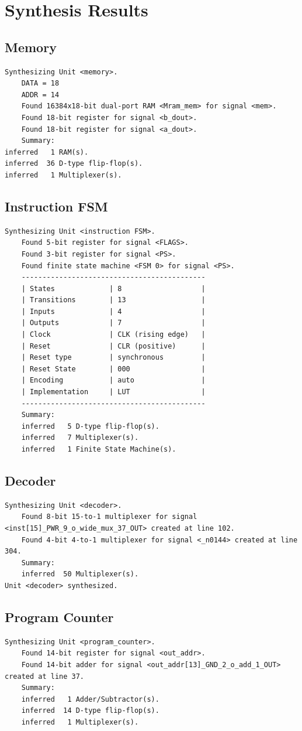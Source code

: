 \documentclass[11pt]{article}
\begin{document}
\section{Synthesis Results}
\subsection{Memory}
\begin{lstlisting}
Synthesizing Unit <memory>.
    DATA = 18
    ADDR = 14
    Found 16384x18-bit dual-port RAM <Mram_mem> for signal <mem>.
    Found 18-bit register for signal <b_dout>.
    Found 18-bit register for signal <a_dout>.
    Summary:
inferred   1 RAM(s).
inferred  36 D-type flip-flop(s).
inferred   1 Multiplexer(s).
\end{lstlisting}
\subsection{Instruction FSM}
\begin{lstlisting}
Synthesizing Unit <instruction FSM>.
    Found 5-bit register for signal <FLAGS>.
    Found 3-bit register for signal <PS>.
    Found finite state machine <FSM 0> for signal <PS>.
    --------------------------------------------
    | States             | 8                   |
    | Transitions        | 13                  |
    | Inputs             | 4                   |
    | Outputs            | 7                   |
    | Clock              | CLK (rising edge)   |
    | Reset              | CLR (positive)      |
    | Reset type         | synchronous         |
    | Reset State        | 000                 |
    | Encoding           | auto                |
    | Implementation     | LUT                 |
    --------------------------------------------
    Summary:
    inferred   5 D-type flip-flop(s).
    inferred   7 Multiplexer(s).
    inferred   1 Finite State Machine(s).
\end{lstlisting}
\subsection{Decoder}
\begin{lstlisting}
Synthesizing Unit <decoder>.
    Found 8-bit 15-to-1 multiplexer for signal <inst[15]_PWR_9_o_wide_mux_37_OUT> created at line 102.
    Found 4-bit 4-to-1 multiplexer for signal <_n0144> created at line 304.
    Summary:
    inferred  50 Multiplexer(s).
Unit <decoder> synthesized.
\end{lstlisting}
\subsection{Program Counter}
\begin{lstlisting}
Synthesizing Unit <program_counter>.
    Found 14-bit register for signal <out_addr>.
    Found 14-bit adder for signal <out_addr[13]_GND_2_o_add_1_OUT> created at line 37.
    Summary:
    inferred   1 Adder/Subtractor(s).
    inferred  14 D-type flip-flop(s).
    inferred   1 Multiplexer(s).
\end{lstlisting}
\end{document}
